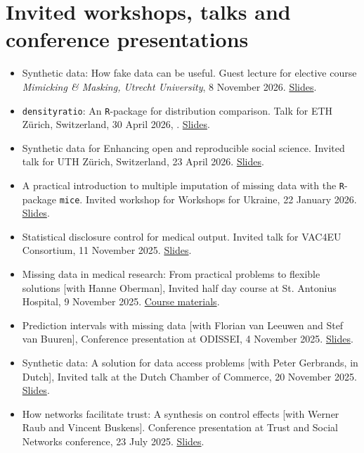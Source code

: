 \documentclass[11pt,a4paper,roman,colorlinks,linkcolor = blue]{moderncv}        %
\begin{document}
\section{Invited workshops, talks and conference presentations}
\begin{itemize}
\item[$\circ$] Synthetic data: How fake data can be useful. Guest lecture for elective course \textit{Mimicking \& Masking, Utrecht University}, 8 November 2026. \href{https://thomvolker.github.io/masking-lecture/}{Slides}.
\item[$\circ$] \texttt{densityratio}: An \texttt{R}-package for distribution comparison. Talk for ETH Z{\"u}rich, Switzerland, 30 April 2026, . \href{https://thomvolker.github.io/densityratio-zuerich/}{Slides}.
\item[$\circ$] Synthetic data for Enhancing open and reproducible social science. Invited talk for UTH Z{\"u}rich, Switzerland, 23 April 2026. \href{https://thomvolker.github.io/synzuerich/}{Slides}.
\item[$\circ$] A practical introduction to multiple imputation of missing data with the \texttt{R}-package \texttt{mice}. Invited workshop for Workshops for Ukraine, 22 January 2026. \href{https://thomvolker.github.io/mice4ukraine}{Slides}.
\item[$\circ$] Statistical disclosure control for medical output. Invited talk for VAC4EU Consortium, 11 November 2025. \href{https://thomvolker.github.io/sdc4vac4eu/}{Slides}.
\item[$\circ$] Missing data in medical research: From practical problems to flexible solutions [with Hanne Oberman], Invited half day course at St. Antonius Hospital, 9 November 2025. \href{https://hanneoberman.github.io/antonius/00_index.html}{Course materials}.
\item[$\circ$] Prediction intervals with missing data [with Florian van Leeuwen and Stef van Buuren], Conference presentation at ODISSEI, 4 November 2025. \href{https://thomvolker.github.io/predint-odissei/predint-odissei.html}{Slides}.
\item[$\circ$] Synthetic data: A solution for data access problems [with Peter Gerbrands, in Dutch], Invited talk at the Dutch Chamber of Commerce, 20 November 2025. \href{https://thomvolker.github.io/talks/presentations/kvk_synthetic_data.pdf}{Slides}.
\item[$\circ$] How networks facilitate trust: A synthesis on control effects [with Werner Raub and Vincent Buskens]. Conference presentation at Trust and Social Networks conference, 23 July 2025. \href{https://osf.io/pw7z5/files/2xdy9}{Slides}.

\end{itemize}
\end{document}
